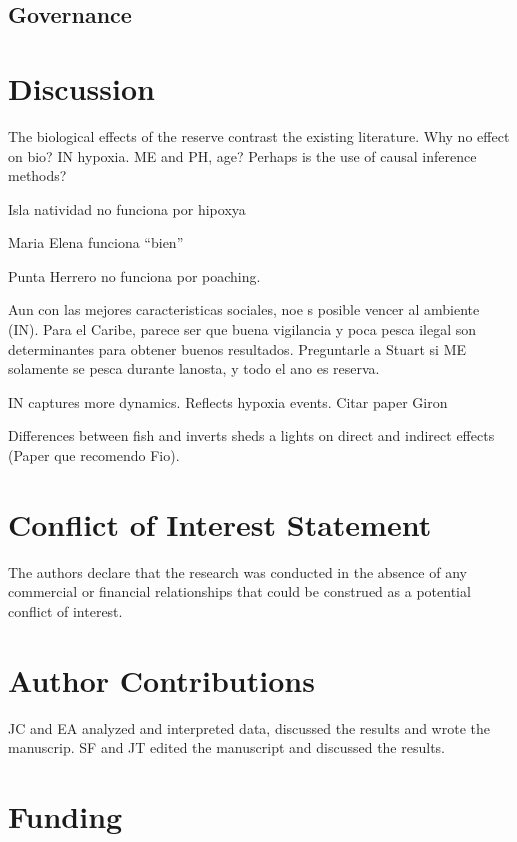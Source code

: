 \documentclass{frontiersSCNS}
\theoremstyle{definition}
\theoremstyle{definition}
\theoremstyle{definition}
\theoremstyle{remark}
\begin{document}
\subsection{Governance}\label{governance-1}

\section{Discussion}\label{discussion}

The biological effects of the reserve contrast the existing literature.
Why no effect on bio? IN hypoxia. ME and PH, age? Perhaps is the use of
causal inference methods?

Isla natividad no funciona por hipoxya

Maria Elena funciona ``bien''

Punta Herrero no funciona por poaching.

Aun con las mejores caracteristicas sociales, noe s posible vencer al
ambiente (IN). Para el Caribe, parece ser que buena vigilancia y poca
pesca ilegal son determinantes para obtener buenos resultados.
Preguntarle a Stuart si ME solamente se pesca durante lanosta, y todo el
ano es reserva.

IN captures more dynamics. Reflects hypoxia events. Citar paper Giron

Differences between fish and inverts sheds a lights on direct and
indirect effects (Paper que recomendo Fio).

\section*{Conflict of Interest Statement}

The authors declare that the research was conducted in the absence of
any commercial or financial relationships that could be construed as a
potential conflict of interest.

\section*{Author Contributions}

JC and EA analyzed and interpreted data, discussed the results and wrote
the manuscrip. SF and JT edited the manuscript and discussed the
results.

\section*{Funding}
\end{document}
